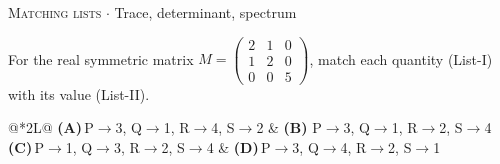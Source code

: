 \documentclass[11pt,a4paper]{article}
\newcommand{\optlabel}[1]{\textbf{(#1)}}
\newcommand{\correctlabel}[1]{\textcolor{okgreen}{\textbf{(#1)}\,\ding{51}}}
\newenvironment{qitem}[1]{\begin{list}{}{\setlength{\leftmargin}{3.3em}\setlength{\labelwidth}{3.1em}%
  \setlength{\labelsep}{0.2em}\setlength{\topsep}{3pt}\setlength{\parsep}{3pt}}\item[\textbf{Q.#1}\hfill]}{\end{list}}
\newcommand{\qmeta}[2]{{\footnotesize\color{black!60}\textsc{#1} \;$\cdot$\; #2}\par}
\begin{document}
\begin{qitem}{3}
\qmeta{Matching lists}{Trace, determinant, spectrum}
For the real symmetric matrix $M = \begin{pmatrix}2 & 1 & 0\\ 1 & 2 & 0\\ 0 & 0 & 5\end{pmatrix}$, match each quantity (List-I) with its value (List-II).
\par\smallskip{}
\par\smallskip\noindent\begin{tabularx}{\linewidth}{@{}*{2}{L}@{}}
\optlabel{A}\,P$\to$3, Q$\to$1, R$\to$4, S$\to$2 & \correctlabel{B}\,P$\to$3, Q$\to$1, R$\to$2, S$\to$4 \\[3pt]
\optlabel{C}\,P$\to$1, Q$\to$3, R$\to$2, S$\to$4 & \optlabel{D}\,P$\to$3, Q$\to$4, R$\to$2, S$\to$1
\end{tabularx}
\end{qitem}
\end{document}
